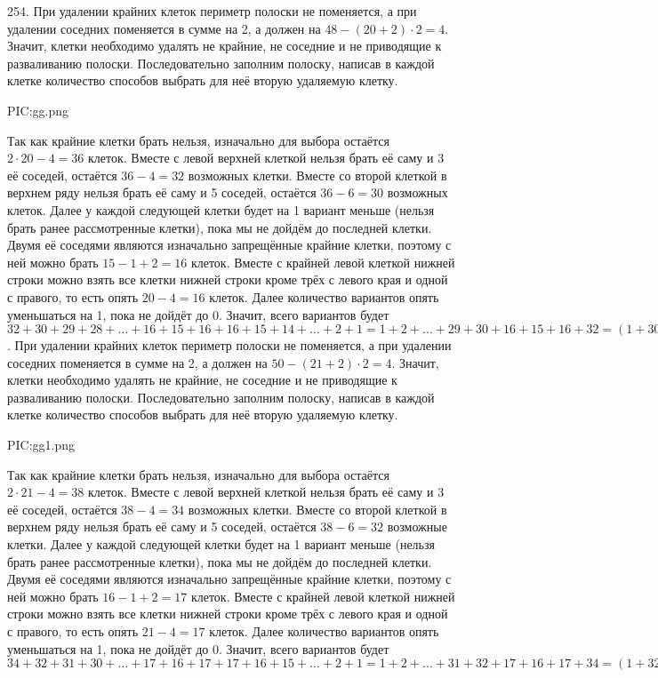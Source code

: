 254. При удалении крайних клеток периметр полоски не поменяется, а при удалении соседних поменяется в сумме на 2, а должен на $48-(20+2)\cdot2=4.$ Значит, клетки необходимо удалять не крайние, не соседние и не приводящие к разваливанию полоски. Последовательно заполним полоску, написав в каждой клетке количество способов выбрать для неё вторую удаляемую клетку.
\begin{center}
{{PIC:gg.png}}
\end{center}
Так как крайние клетки брать нельзя, изначально для выбора остаётся $2\cdot20-4=36$ клеток. Вместе с левой верхней клеткой нельзя брать её саму и 3 её соседей, остаётся $36-4=32$ возможных клетки. Вместе со второй клеткой в верхнем ряду нельзя брать её саму и 5 соседей, остаётся $36-6=30$ возможных клеток. Далее у каждой следующей клетки будет на 1 вариант меньше (нельзя брать ранее рассмотренные клетки), пока мы не дойдём до последней клетки. Двумя её соседями являются изначально запрещённые крайние клетки, поэтому с ней можно брать $15-1+2=16$ клеток. Вместе с крайней левой клеткой нижней строки можно взять все клетки нижней строки кроме трёх с левого края и одной с правого, то есть опять $20-4=16$ клеток. Далее количество вариантов опять уменьшаться на 1, пока не дойдёт до 0. Значит, всего вариантов будет $32+30+29+28+\ldots+16+15+16+16+15+14+\ldots+2+1=1+2+\ldots+29+30+16+15+16+32=(1+30)+(2+29)+\ldots+(15+16)+79=31\cdot15+79=544.$\newpage{}. При удалении крайних клеток периметр полоски не поменяется, а при удалении соседних поменяется в сумме на 2, а должен на $50-(21+2)\cdot2=4.$ Значит, клетки необходимо удалять не крайние, не соседние и не приводящие к разваливанию полоски. Последовательно заполним полоску, написав в каждой клетке количество способов выбрать для неё вторую удаляемую клетку.
\begin{center}
{{PIC:gg1.png}}
\end{center}
Так как крайние клетки брать нельзя, изначально для выбора остаётся $2\cdot21-4=38$ клеток. Вместе с левой верхней клеткой нельзя брать её саму и 3 её соседей, остаётся $38-4=34$ возможных клетки. Вместе со второй клеткой в верхнем ряду нельзя брать её саму и 5 соседей, остаётся $38-6=32$ возможные клетки. Далее у каждой следующей клетки будет на 1 вариант меньше (нельзя брать ранее рассмотренные клетки), пока мы не дойдём до последней клетки. Двумя её соседями являются изначально запрещённые крайние клетки, поэтому с ней можно брать $16-1+2=17$ клеток. Вместе с крайней левой клеткой нижней строки можно взять все клетки нижней строки кроме трёх с левого края и одной с правого, то есть опять $21-4=17$ клеток. Далее количество вариантов опять уменьшаться на 1, пока не дойдёт до 0. Значит, всего вариантов будет $34+32+31+30+\ldots+17+16+17+17+16+15+\ldots+2+1=1+2+\ldots+31+32+17+16+17+34=(1+32)+(2+21)+\ldots+(16+17)+84=33\cdot16+84=612.$\\
